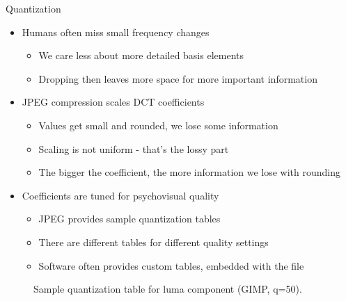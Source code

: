 \documentclass[10pt,aspectratio=169]{beamer}
\begin{document}
\begin{frame}{Quantization}
	\begin{itemize}
		\item Humans often miss small frequency changes
		\begin{itemize}
			\item We care less about more detailed basis elements
			\item Dropping then leaves more space for more important information
		\end{itemize}
		\item JPEG compression scales DCT coefficients
		\begin{itemize}
			\item Values get small and rounded, we lose some information
			\item Scaling is not uniform - that's the lossy part
			\item The bigger the coefficient, the more information we lose with rounding
		\end{itemize}
		\item Coefficients are tuned for psychovisual quality
		\begin{itemize}
			\item JPEG provides sample quantization tables
			\item There are different tables for different quality settings
			\item Software often provides custom tables, embedded with the file
		\end{itemize}
	\end{itemize}
\end{frame}

\begin{frame}[c,plain]
\vspace{5pt}
\begin{figure}
	\centering
	\vspace{5pt}
	\caption{Sample quantization table for luma component (GIMP, q=50).}
\end{figure}
\end{frame}
\end{document}
